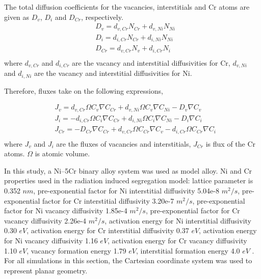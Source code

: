 \documentclass[utf8]{frontiersSCNS} %
\begin{document}
The total diffusion coefficients for the vacancies, interstitials and Cr atoms are given as $D_{v}$, $D_{i}$ and $D_{Cr}$, respectively.
\begin{equation}
    \begin{aligned}
    &D_{v} = d_{v,Cr}N_{Cr}+d_{v,Ni}N_{Ni}\\
    &D_{i} = d_{i,Cr}N_{Cr}+d_{i,Ni}N_{Ni}\\
    &D_{Cr} = d_{v,Cr}N_{v}+d_{i,Cr}N_{i}\\
    \end{aligned}
    \label{equation:RIS_totaldiffusioncoefficients}
 \end{equation}   
where $d_{v,Cr}$ and $d_{i,Cr}$ are the vacancy and interstitial diffusivities for Cr, $d_{v,Ni}$ and $d_{i,Ni}$ are the vacancy and interstitial diffusivities for Ni. 

Therefore, fluxes take on the following expressions,
 
 \begin{equation}
    \begin{aligned}
    &J_{v} = d_{v,Cr}\Omega C_{v}\nabla C_{Cr} + d_{v,Ni}\Omega C_{v}\nabla C_{Ni} - D_{v}\nabla C_{v}\\
    &J_{i} = -d_{i,Cr}\Omega C_{i}\nabla C_{Cr} + d_{i,Ni}\Omega C_{i}\nabla C_{Ni} - D_{i}\nabla C_{i}\\
    &J_{Cr} = -D_{Cr}\nabla C_{Cr} + d_{v,Cr}\Omega C_{Cr}\nabla C_{v} - d_{i,Cr}\Omega C_{Cr}\nabla C_{i}\\
    \end{aligned}
    \label{equation:RIS_flux_equations}
 \end{equation}
where $J_{v}$ and $J_{i}$ are the fluxes of vacancies and interstitials, $J_{Cr}$ is flux of the Cr atoms. $\Omega$ is atomic volume.

In this study, a Ni–5Cr binary alloy system was used as model alloy. Ni and Cr properties used in the radiation induced segregation model: lattice parameter is 0.352 $nm$, pre-exponential factor for Ni interstitial diffusivity 5.04e-8 $m^2/s$, pre-exponential factor for Cr interstitial diffusivity 3.20e-7 $m^2/s$, pre-exponential factor for Ni vacancy diffusivity 1.85e-4 $m^2/s$, pre-exponential factor for Cr vacancy diffusivity 2.26e-4 $m^2/s$, activation energy for Ni interstitial diffusivity 0.30 $eV$, activation energy for Cr interstitial diffusivity 0.37 $eV$, activation energy for Ni vacancy diffusivity 1.16 $eV$, activation energy for Cr vacancy diffusivity 1.10 $eV$, vacancy formation energy 1.79 $eV$, interstitial formation energy 4.0 $eV$ \citep{barr_grain_2015}. For all simulations in this section, the Cartesian coordinate system was used to represent planar geometry.
\end{document}
